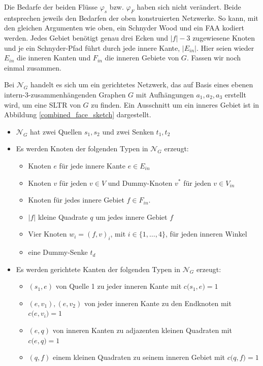 Die Bedarfe der beiden Flüsse $\varphi_s$ bzw. $\varphi_F$ haben sich nicht verändert. Beide entsprechen jeweils den Bedarfen der oben konstruierten Netzwerke. So kann, mit den gleichen Argumenten wie oben, ein Schnyder Wood und ein FAA kodiert werden. Jedes Gebiet benötigt genau drei Ecken und $|f|-3$ zugewiesene Knoten und je ein Schnyder-Pfad führt durch jede innere Kante, $|E_{in}|$. Hier seien wieder $E_{in}$ die inneren Kanten und $F_{in}$ die inneren Gebiete von $G$. Fassen wir noch einmal zusammen.

\begin{network}[SLTR]\label{net_sltr}
Bei $\mathcal{N}_G$ handelt es sich um ein gerichtetes Netzwerk, das auf Basis eines ebenen intern-3-zusammenhängenden Graphen $G$ mit Aufhängungen $a_1,a_2,a_3$ erstellt wird, um eine SLTR von $G$ zu finden. Ein Ausschnitt um ein inneres Gebiet ist in Abbildung \ref{combined_face_sketch} dargestellt.
	\begin{itemize}
	\item $\mathcal{N}_G$ hat zwei Quellen $s_1,s_2$ und zwei Senken $t_1,t_2$
	\item Es werden Knoten der folgenden Typen in $\mathcal{N}_G$ erzeugt:
		\begin{itemize}
		\item Knoten $e$ für jede innere Kante $e \in E_{in}$
		\item Knoten $v$ für jeden $v \in V$ und Dummy-Knoten $v^*$ für jeden $v \in V_{in}$
		\item Knoten für jedes innere Gebiet $f \in F_{in}$.
		\item $|f|$ kleine Quadrate $q$ um jedes innere Gebiet $f$
		\item Vier Knoten $w_i=(f,v)_i$, mit $i\in\{1,\ldots,4\}$, für jeden inneren Winkel
		\item eine Dummy-Senke $t_d$
		\end{itemize}
	\item Es werden gerichtete Kanten der folgenden Typen in $\mathcal{N}_G$ erzeugt:
		\begin{itemize}
		\item $(s_1,e)$ von Quelle 1 zu jeder inneren Kante mit $c\big(s_1,e\big) = 1$
		\item $(e,v_1),(e,v_2)$ von jeder inneren Kante zu den Endknoten mit $c\big(e,v_i\big) = 1$
		\item $(e,q)$ von inneren Kanten zu adjazenten kleinen Quadraten mit $c\big(e,q\big) = 1$
		\item $(q,f)$ einem kleinen Quadraten zu seinem inneren Gebiet mit $c\big(q,f\big) = 1$

\end{itemize}
\end{itemize}
\end{network}
